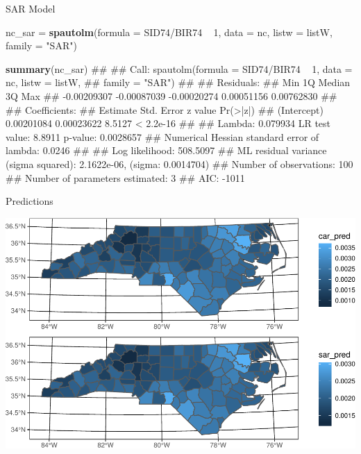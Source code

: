 \documentclass[11pt,ignorenonframetext,]{beamer}
\newenvironment{Shaded}{}{}
\newcommand{\DataTypeTok}[1]{\textcolor[rgb]{0.56,0.13,0.00}{#1}}
\newcommand{\DecValTok}[1]{\textcolor[rgb]{0.25,0.63,0.44}{#1}}
\newcommand{\KeywordTok}[1]{\textcolor[rgb]{0.00,0.44,0.13}{\textbf{#1}}}
\newcommand{\NormalTok}[1]{#1}
\newcommand{\OperatorTok}[1]{\textcolor[rgb]{0.40,0.40,0.40}{#1}}
\newcommand{\StringTok}[1]{\textcolor[rgb]{0.25,0.44,0.63}{#1}}
\let\oldShaded\Shaded
\let\endoldShaded\endShaded
\renewenvironment{Shaded}{\footnotesize\begin{spacing}{0.9}\oldShaded}{\endoldShaded\end{spacing}}
\let\oldverbatim\verbatim
\let\endoldverbatim\endverbatim
\newcommand{\scriptoutput}{
  \renewenvironment{Shaded}{\scriptsize\begin{spacing}{0.9}\oldShaded}{\endoldShaded\end{spacing}}
  \renewenvironment{verbatim}{\scriptsize\begin{spacing}{0.9}\oldverbatim}{\endoldverbatim\end{spacing}}
}
\begin{document}
\begin{frame}[fragile,t]{SAR Model}
\protect\hypertarget{sar-model}{}

\scriptoutput

\begin{Shaded}
\begin{Highlighting}[]
\NormalTok{nc_sar =}\StringTok{ }\KeywordTok{spautolm}\NormalTok{(}\DataTypeTok{formula =}\NormalTok{ SID74}\OperatorTok{/}\NormalTok{BIR74 }\OperatorTok{~}\StringTok{ }\DecValTok{1}\NormalTok{, }\DataTypeTok{data =}\NormalTok{ nc, }
                  \DataTypeTok{listw =}\NormalTok{ listW, }\DataTypeTok{family =} \StringTok{"SAR"}\NormalTok{)}

\KeywordTok{summary}\NormalTok{(nc_sar)}
\NormalTok{## }
\NormalTok{## Call: spautolm(formula = SID74/BIR74 ~ 1, data = nc, listw = listW, }
\NormalTok{##     family = "SAR")}
\NormalTok{## }
\NormalTok{## Residuals:}
\NormalTok{##         Min          1Q      Median          3Q         Max }
\NormalTok{## -0.00209307 -0.00087039 -0.00020274  0.00051156  0.00762830 }
\NormalTok{## }
\NormalTok{## Coefficients: }
\NormalTok{##               Estimate Std. Error z value  Pr(>|z|)}
\NormalTok{## (Intercept) 0.00201084 0.00023622  8.5127 < 2.2e-16}
\NormalTok{## }
\NormalTok{## Lambda: 0.079934 LR test value: 8.8911 p-value: 0.0028657 }
\NormalTok{## Numerical Hessian standard error of lambda: 0.0246 }
\NormalTok{## }
\NormalTok{## Log likelihood: 508.5097 }
\NormalTok{## ML residual variance (sigma squared): 2.1622e-06, (sigma: 0.0014704)}
\NormalTok{## Number of observations: 100 }
\NormalTok{## Number of parameters estimated: 3 }
\NormalTok{## AIC: -1011}
\end{Highlighting}
\end{Shaded}

\end{frame}

\begin{frame}{Predictions}
\protect\hypertarget{predictions}{}

\begin{center}\includegraphics[width=\textwidth]{Lec18_files/figure-beamer/unnamed-chunk-15-1} \end{center}

\end{frame}
\end{document}
